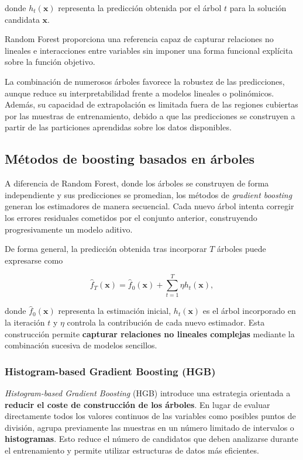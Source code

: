 donde \(h_t(\mathbf{x})\) representa la predicción obtenida por el árbol \(t\) para la solución candidata \(\mathbf{x}\).

Random Forest proporciona una referencia capaz de capturar relaciones no lineales e interacciones entre variables sin imponer una forma funcional explícita sobre la función objetivo.

La combinación de numerosos árboles favorece la robustez de las predicciones, aunque reduce su interpretabilidad frente a modelos lineales o polinómicos. Además, su capacidad de extrapolación es limitada fuera de las regiones cubiertas por las muestras de entrenamiento, debido a que las predicciones se construyen a partir de las particiones aprendidas sobre los datos disponibles.

\subsection{Métodos de boosting basados en árboles}

A diferencia de Random Forest, donde los árboles se construyen de forma independiente y sus predicciones se promedian, los métodos de \textit{gradient boosting} generan los estimadores de manera secuencial. Cada nuevo árbol intenta corregir los errores residuales cometidos por el conjunto anterior, construyendo progresivamente un modelo aditivo.

De forma general, la predicción obtenida tras incorporar \(T\) árboles puede expresarse como

\begin{equation}
    \hat{f}_T(\mathbf{x})
    =
    \hat{f}_0(\mathbf{x})
    +
    \sum_{t=1}^{T}
    \eta
    h_t(\mathbf{x}),
\end{equation}

donde \(\hat{f}_0(\mathbf{x})\) representa la estimación inicial, \(h_t(\mathbf{x})\) es el árbol incorporado en la iteración \(t\) y \(\eta\) controla la contribución de cada nuevo estimador. Esta construcción permite \textbf{capturar relaciones no lineales complejas} mediante la combinación sucesiva de modelos sencillos.

\subsubsection{Histogram-based Gradient Boosting (HGB)}

\textit{Histogram-based Gradient Boosting} (HGB) introduce una estrategia orientada a \textbf{reducir el coste de construcción de los árboles}. En lugar de evaluar directamente todos los valores continuos de las variables como posibles puntos de división, agrupa previamente las muestras en un número limitado de intervalos o \textbf{histogramas}. Esto reduce el número de candidatos que deben analizarse durante el entrenamiento y permite utilizar estructuras de datos más eficientes.


